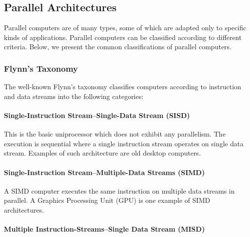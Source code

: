 
\subsection{Parallel Architectures}

Parallel computers are of many types, some of which are adapted only to specific kinds of applications. Parallel computers can be classified according to different criteria. Below, we present the common classifications of parallel computers. 

\subsubsection{Flynn's Taxonomy}

The well-known Flynn's taxonomy \cite{flynn:1972} classifies computers according to instruction and data streams into the following categories:

\paragraph{Single-Instruction Stream--Single-Data Stream (SISD)}

This is the basic uniprocessor which does not exhibit any parallelism. The execution is sequential where a single instruction stream operates on single data stream. Examples of such architecture are old desktop computers.

\paragraph{Single-Instruction Stream--Multiple-Data Streams (SIMD)}

A SIMD computer executes the same instruction on multiple data streams in parallel. A Graphics Processing Unit (GPU) is one example of SIMD architectures.

\paragraph{Multiple Instruction-Streams--Single Data Stream (MISD)}

